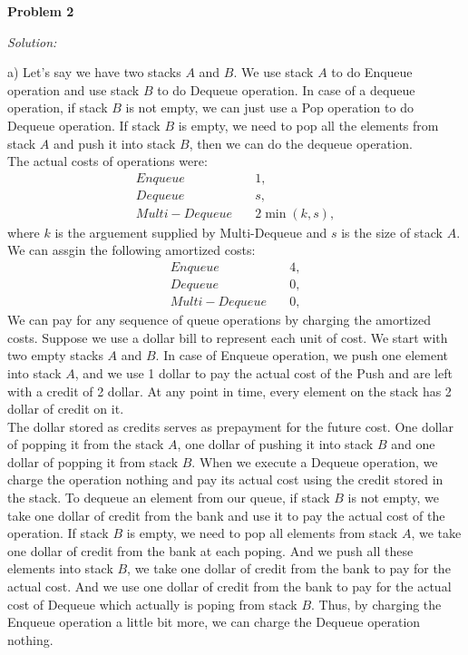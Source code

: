 \documentclass[12pt,letterpaper]{article}
\def\pp{\par\noindent}
\newcommand{\problem}[1]{ \bigskip \pp \textbf{Problem #1}\par}
\newcommand{\solution}{\textit{Solution:}\par}
\begin{document}
\problem{2}
\solution
a) Let's say we have two stacks $A$ and $B$. We use stack $A$ to do Enqueue operation and use stack $B$ to do Dequeue operation. In case of a dequeue operation, if stack $B$ is not empty, we can just use a Pop operation to do Dequeue operation. If stack $B$ is empty, we need to pop all the elements from stack $A$ and push it into stack $B$, then we can do the dequeue operation. \\
The actual costs of operations were:
\begin{align*}
Enqueue \quad & 1, \\
Dequeue \quad & s, \\
Multi-Dequeue \quad & 2 \min(k,s),
\end{align*}
where $k$ is the arguement supplied by Multi-Dequeue and $s$ is the size of stack $A$. We can assgin the following amortized costs: 
\begin{align*}
Enqueue \quad & 4, \\
Dequeue \quad & 0, \\
Multi-Dequeue \quad & 0,
\end{align*}
We can pay for any sequence of queue operations by charging the amortized costs. Suppose we use a dollar bill to represent each unit of cost. We start with two empty stacks $A$ and $B$. In case of Enqueue operation, we push one element into stack $A$, and we use 1 dollar to pay the actual cost of the Push and are left with a credit of 2 dollar. At any point in time, every element on the stack has 2 dollar of credit on it. \\
The dollar stored as credits serves as prepayment for the future cost. One dollar of popping it from the stack $A$, one dollar of pushing it into stack $B$ and one dollar of popping it from stack $B$. When we execute a Dequeue operation, we charge the operation nothing and pay its actual cost using the credit stored in the stack. To dequeue an element from our queue, if stack $B$ is not empty, we take one dollar of credit from the bank and use it to pay the actual cost of the operation. If stack $B$ is empty, we need to pop all elements from stack $A$, we take one dollar of credit from the bank at each poping. And we push all these elements into stack $B$, we take one dollar of credit from the bank to pay for the actual cost. And we use one dollar of credit from the bank to pay for the actual cost of Dequeue which actually is poping from stack $B$. Thus, by charging the Enqueue operation a little bit more, we can charge the Dequeue operation nothing. \\
\end{document}
